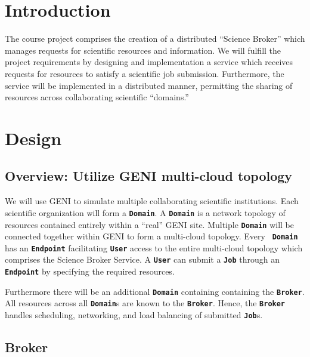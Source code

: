 \documentclass{ReportCUNY}
\newcommand{\KeyWord}[1]{\textbf{\texttt{#1}}}
\begin{document}
\setlength{\belowdisplayskip}{0pt} \setlength{\belowdisplayshortskip}{1pt}
\setlength{\abovedisplayskip}{0pt} \setlength{\abovedisplayshortskip}{1pt}
\setlength{\abovedisplayskip}{5pt}
\setlength{\belowdisplayskip}{5pt}

\section{Introduction}

The course project comprises the creation of a distributed ``Science Broker'' which manages requests for scientific resources and information.
We will fulfill the project requirements by designing and implementation a service which receives requests for resources to satisfy a scientific job submission.
Furthermore, the service will be implemented in a distributed manner, permitting the sharing of resources across collaborating scientific ``domains.''


\section{Design}

\subsection{Overview: Utilize GENI multi-cloud topology}

We will use GENI to simulate multiple collaborating scientific institutions.
Each scientific organization will form a \KeyWord{Domain}.
A \KeyWord{Domain} is a network topology of resources contained entirely within a ``real'' GENI site.
Multiple \KeyWord{Domain} will be connected together within GENI to form a multi-cloud topology.
Every \ \KeyWord{Domain} has an \KeyWord{Endpoint} facilitating \KeyWord{User} access to the entire multi-cloud topology which comprises the Science Broker Service.
A \KeyWord{User} can submit a \KeyWord{Job} through an \KeyWord{Endpoint} by specifying the required resources.

Furthermore there will be an additional \KeyWord{Domain} containing containing the \KeyWord{Broker}.
All resources across all \KeyWord{Domain}s are known to the \KeyWord{Broker}.
Hence, the \KeyWord{Broker} handles scheduling, networking, and load balancing of submitted \KeyWord{Job}s.


\subsection{Broker}
\end{document}
